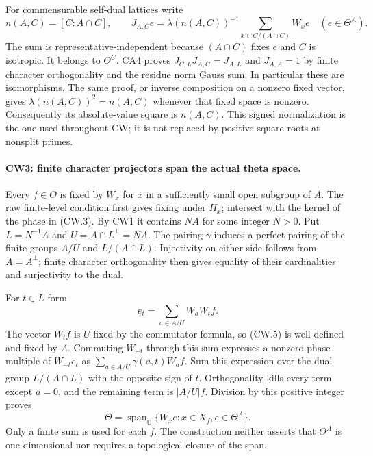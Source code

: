 For commensurable self-dual lattices write
\[
 n(A,C)=[C:A\cap C],\qquad
 J_{A,C}e=\lambda(n(A,C))^{-1}
       \sum_{x\in C/(A\cap C)}W_xe\quad(e\in\Theta^A).
                                                               \tag{CW.4}
\]
The sum is representative-independent because $(A\cap C)$ fixes $e$
and $C$ is isotropic.  It belongs to $\Theta^C$.  CA4 proves
$J_{C,L}J_{A,C}=J_{A,L}$ and $J_{A,A}=1$ by finite character
orthogonality and the residue norm Gauss sum.  In particular these are
isomorphisms.  The same proof, or inverse composition on a nonzero
fixed vector, gives $\lambda(n(A,C))^2=n(A,C)$ whenever that fixed
space is nonzero.  Consequently its absolute-value square is
$n(A,C)$.  This signed normalization is the one used throughout CW;
it is not replaced by positive square roots at nonsplit primes.

\paragraph{CW3: finite character projectors span the actual theta space.}
Every $f\in\Theta$ is fixed by $W_x$ for $x$ in a sufficiently small
open subgroup of $A$.  The raw finite-level condition first gives
fixing under $H_x$; intersect with the kernel of the phase in (CW.3).
By CW1 it contains $NA$ for some integer $N>0$.
Put $L=N^{-1}A$ and
$U=A\cap L^\perp=NA$.  The pairing $\gamma$ induces a perfect pairing
of the finite groups $A/U$ and $L/(A\cap L)$.  Injectivity on either
side follows from $A=A^\perp$; finite character orthogonality then
gives equality of their cardinalities and surjectivity to the dual.

For $t\in L$ form
\[
 e_t=\sum_{a\in A/U}W_aW_tf.
                                                               \tag{CW.5}
\]
The vector $W_tf$ is $U$-fixed by the commutator formula, so (CW.5)
is well-defined and fixed by $A$.  Commuting $W_{-t}$ through this
sum expresses a nonzero phase multiple of $W_{-t}e_t$ as
$\sum_{a\in A/U}\gamma(a,t)W_af$.
Sum this expression over the dual group $L/(A\cap L)$ with the
opposite sign of $t$.  Orthogonality kills every term except $a=0$,
and the remaining term is $|A/U|f$.  Division by this positive integer
proves
\[
             \Theta=\operatorname{span}_{\mathbb C}
                   \{W_xe:x\in X_f, e\in\Theta^A\}.    \tag{CW.6}
\]
Only a finite sum is used for each $f$.  The construction neither
asserts that $\Theta^A$ is one-dimensional nor requires a topological
closure of the span.

